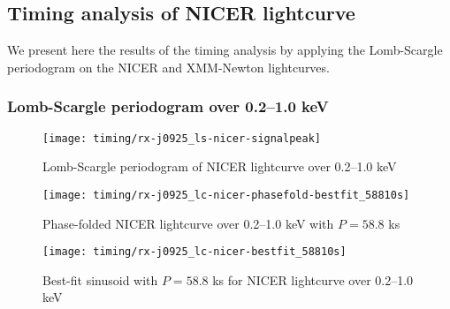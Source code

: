 			
		\subsection{Timing analysis of NICER lightcurve}
		
			We present here the results of the timing analysis by applying the Lomb-Scargle periodogram on the NICER and XMM-Newton lightcurves.
			
			\subsubsection*{Lomb-Scargle periodogram over 0.2--1.0 keV}
			\begin{figure}[h!]
				\centering
				\texttt{[image: timing/rx-j0925\_ls-nicer-signalpeak]}
				\caption{Lomb-Scargle periodogram of NICER lightcurve over 0.2--1.0 keV}
				\label{result:ls-mrvel-nicer}
			\end{figure}
			
			\begin{figure}[h!]
				\centering
				\texttt{[image: timing/rx-j0925\_lc-nicer-phasefold-bestfit\_58810s]}
				\caption{Phase-folded NICER lightcurve over 0.2--1.0 keV with $P=58.8$ ks}
				\label{result:lc-phasefold-mrvel-nicer}
			\end{figure}
			
			\begin{figure}[h!]
				\centering
				\texttt{[image: timing/rx-j0925\_lc-nicer-bestfit\_58810s]}
				\caption{Best-fit sinusoid with $P=58.8$ ks for NICER lightcurve over 0.2--1.0 keV}
				\label{result:lc-bestfit-mrvel-nicer}
			\end{figure}
			
			
			
